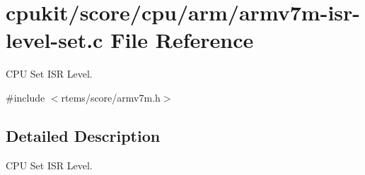\hypertarget{armv7m-isr-level-set_8c}{}\section{cpukit/score/cpu/arm/armv7m-\/isr-\/level-\/set.c File Reference}
\label{armv7m-isr-level-set_8c}


C\+PU Set I\+SR Level.  


{\ttfamily \#include $<$rtems/score/armv7m.\+h$>$}\newline


\subsection{Detailed Description}
C\+PU Set I\+SR Level. 


